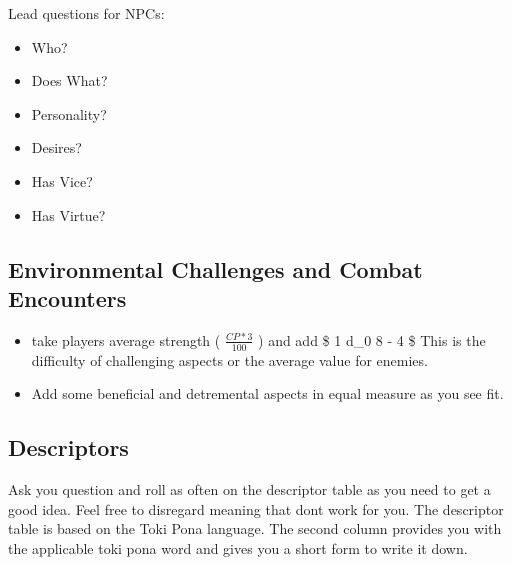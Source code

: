 \documentclass[11pt]{article}
\begin{document}
{Lead questions for NPCs:
\begin{itemize}
\item Who?
\item Does What?
\item Personality?
\item Desires?
\item Has Vice?
\item Has Virtue?
\end{itemize}

\subsection{Environmental Challenges and Combat Encounters}
\label{sec:orgcf785ba}

\begin{itemize}
\item take players average strength ( \(\frac{CP*3}{100}\) ) and add \$ 1 d\_0 8 - 4 \$
This is the difficulty of challenging aspects or the average value for enemies.
\item Add some beneficial and detremental aspects in equal measure as you see fit.
\end{itemize}

\subsection{Descriptors}
\label{sec:orga6d0ad4}

Ask you question and roll as often on the descriptor table as you need to get a good idea. Feel free to disregard meaning that dont work for you.
The descriptor table is based on the Toki Pona language. The second column provides you with the applicable toki pona word and gives you a short form to write it down. 

\newpage
}
\end{document}
